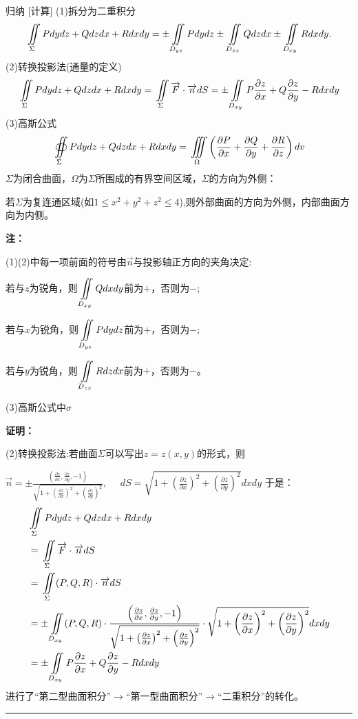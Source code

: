 \documentclass[a4paper,12pt,oneside,fontset=none]{ctexbook}
\renewcommand{\leq}{\leqslant}
\let\oldiint\iint
\renewcommand{\iint}{\displaystyle{\vrule width 0pt height 0em depth 0em}\oldiint}
\let\oldiiint\iiint
\renewcommand{\iiint}{\displaystyle{\vrule width 0pt height 0em depth 0em}\oldiiint}
\let\oldoiint\oiint
\renewcommand{\oiint}{\displaystyle{\vrule width 0pt height 1.5em depth 1.5em}\oldoiint}
\newenvironment{induction}[1][]{\begin{thmBox}{归纳}{#1}}{\end{thmBox}}
\newenvironment{note}{
    \par\vspace{0.5em}\noindent
    \textbf{\color{NoteColor} 注：}
}{
    \par\vspace{0.5em}
}
\renewenvironment{proof}{
    \par\vspace{0.5em}\noindent
    \textbf{\color{LogicColor} 证明：}
}{
    \hfill \textcolor{LogicColor}{\rule{0.6em}{0.6em}} \par
}
\numberwithin{equation}{chapter}
\begin{document}
\begin{induction}
    [计算]
    (1)拆分为二重积分
    $$\iint\limits_{\Sigma} Pdy dz + Qdz dx + Rdx dy = \pm \iint\limits_{D_{yz}}Pdy dz \pm \iint\limits_{D_{zx}}Qdz dx \pm \iint\limits_{D_{xy}}Rdx dy.$$
    (2)转换投影法(通量的定义)
    $$\iint\limits_{\Sigma} Pdy dz + Qdz dx + Rdx dy = \iint\limits_{\Sigma} \overrightarrow{F} \cdot \overrightarrow{n} dS = \pm \iint\limits_{D_{xy}}P\frac{\partial z}{\partial x} + Q\frac{\partial z}{\partial y} - R dxdy$$
    (3)高斯公式
    $$\oiint\limits_{\Sigma} Pdy dz + Qdz dx + Rdx dy = \iiint\limits_{\Omega} \left(\frac{\partial P}{\partial x} + \frac{\partial Q}{\partial y} + \frac{\partial R}{\partial z}\right) dv$$
    $\Sigma$为闭合曲面，$\Omega$为$\Sigma$所围成的有界空间区域，$\Sigma$的方向为外侧：

    若$\Sigma$为复连通区域(如$1\leq x^2+y^2+z^2\leq 4$),则外部曲面的方向为外侧，内部曲面方向为内侧。
\end{induction}
\begin{note}
    (1)(2)中每一项前面的符号由$\overrightarrow{n}$与投影轴正方向的夹角决定:
    
    若与$z$为锐角，则$\iint\limits_{D_{xy}}Qdx dy$前为$+$，否则为$-$;

    若与$x$为锐角，则$\iint\limits_{D_{yz}}Pdy dz$前为$+$，否则为$-$;

    若与$y$为锐角，则$\iint\limits_{D_{zx}}Rdz dx$前为$+$，否则为$-$。

    (3)高斯公式中$\sigma$
\end{note}
\begin{proof}
    (2)转换投影法:若曲面$\Sigma$可以写出$z = z(x,y)$的形式，则
    
    $\overrightarrow{n} = \pm \frac{\left(\frac{\partial z}{\partial x}, \frac{\partial z}{\partial y}, -1\right)}{\sqrt{1 + \left(\frac{\partial z}{\partial x}\right)^2 + \left(\frac{\partial z}{\partial y}\right)^2}},$
    $\quad dS = \sqrt{1 + \left(\frac{\partial z}{\partial x}\right)^2 + \left(\frac{\partial z}{\partial y}\right)^2} dxdy$
于是：
    \begin{align*}
        &\iint\limits_{\Sigma} Pdy dz + Qdz dx + Rdx dy\\
      &= \iint\limits_{\Sigma} \overrightarrow{F} \cdot \overrightarrow{n} dS \\ 
      &= \iint\limits_{\Sigma} (P,Q,R)\cdot \overrightarrow{n} dS \\
      &= \pm \iint\limits_{D_{xy}} (P,Q,R)\cdot \frac{\left(\frac{\partial z}{\partial x}, \frac{\partial z}{\partial y}, -1\right)}{\sqrt{1 + \left(\frac{\partial z}{\partial x}\right)^2 + \left(\frac{\partial z}{\partial y}\right)^2}} \cdot \sqrt{1 + \left(\frac{\partial z}{\partial x}\right)^2 + \left(\frac{\partial z}{\partial y}\right)^2} dxdy  \\
      &=  \pm \iint\limits_{D_{xy}} P\frac{\partial z}{\partial x} + Q\frac{\partial z}{\partial y} - R dxdy
    \end{align*}
    进行了“第二型曲面积分”$\rightarrow$“第一型曲面积分”$\rightarrow$“二重积分”的转化。
\end{proof}
\end{document}
